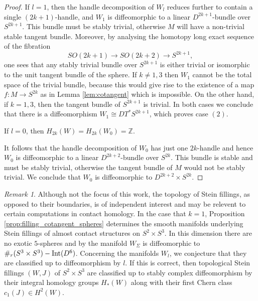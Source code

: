\documentclass[12pt]{amsart}
\newcommand\Z{\mathbb{Z}}
\newcommand\del{\partial}
\theoremstyle{remark}
\newtheorem{Remark}[Theorem]{Remark}
\newcommand{\jbcomm}[1]{\begingroup\color{green}JB:~#1\endgroup}
\begin{document}
\begin{proof}
If $l = 1$, then the handle decomposition of $W_l$ reduces further to
contain a single $(2k{+}1)$-handle, and $W_1$ is diffeomorphic to a
linear $D^{2k{+}1}$-bundle over $S^{2k{+}1}$.  This bundle must be stably
trivial, otherwise $M$ will have a non{-}trivial stable tangent bundle.
Moreover, by analysing the homotopy long exact sequence of the fibration
\[
SO(2k{+}1) \to SO(2k{+}2) \to S^{2k{+}1},
\]
one sees that any stably trivial bundle over $S^{2k{+}1}$ is either
trivial or isomorphic to the unit tangent bundle of the sphere. If $k
\neq 1, 3$ then $W_1$ cannot be the total space of the trivial bundle,
because this would give rise to the existence of a map $f \colon M \to
S^{2k}$ as in Lemma \ref{lem:cotangent} which is impossible.  On the
other hand, if $k = 1, 3$, then the tangent bundle of $S^{2k{+}1}$ is trivial.
In both cases we conclude that there is a diffeomorphism $W_1 \cong
DT^*S^{2k{+}1}$, which proves case $(2)$.

If $l = 0$, then $H_{2k}(W) = H_{2k}(W_0) =\Z$. 
\begin{comment}
since $W \simeq W _0
\natural W_\Sigma$, we conclude that there is a map $g \colon W \to
S^{2k}$ inducing an isomorphism on $H_{2k}$.  The map $f \colon \del W
\to S^{2k}$ obtained by composing the inclusion $\del W \to W$ with
$g$ then gives a map satisfying the hypotheses of Lemma
\ref{lem:cotangent} and hence $k = 1, 3$.  Moreover,
\end{comment} 
It follows that the handle
decomposition of $W_0$ has just one $2k$-handle and hence $W_0$ is
diffeomorphic to a linear $D^{2k{+}2}$-bundle over $S^{2k}$.  This
bundle is stable and must be stably trivial, otherwise the tangent bundle of
$M$ would not be stably trivial.  We conclude that $W_0$ is
diffeomorphic to $D^{2k{+}2} \times S^{2k}$.
\end{proof}


\begin{Remark} \label{rem:6d-fillings}
Although not the focus of this work, the topology of Stein fillings,
as opposed to their boundaries, is of independent interest and may be
relevent to certain computations in contact homology.  In the case that $k = 1$, Proposition \ref{prop:filling_cotangent_spheres} determines the
smooth manifolds underlying Stein fillings of almost contact
structures on $S^2 \times S^3$.  In this dimension there are no exotic
$5$-spheres \cite{Kervaire-Milnor63} and by \cite[Theorem
  6.2]{Smale62} the manifold $W_\Sigma$ is diffeomorphic to $\#_r(S^3
\times S^3)-{\rm Int}(D^6)$.  Concerning the manifolds $W_l$, we
conjecture that they are classified up to diffeomorphism by $l$.  If
this is correct, then topological Stein fillings $(W, J)$ of $S^2
\times S^3$ are classified up to stably complex diffeomorphism by
their integral homology groups $H_*(W)$ along with their first Chern class 
$c_1(J) \in H^2(W)$.
\end{Remark}
\end{document}
